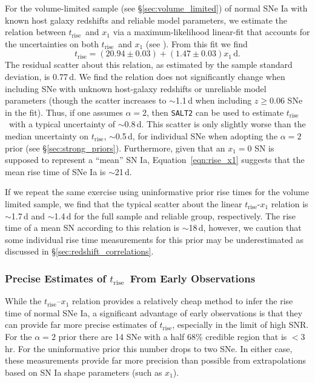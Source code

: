 \documentclass[twocolumn]{aastex63}
\newcommand{\trise}{$t_\mathrm{rise}$}
\begin{document}
For the volume-limited sample (see \S\ref{sec:volume_limited}) of normal SNe
Ia with known host galaxy redshifts and reliable model parameters, we estimate
the relation between \trise\ and $x_1$ via a maximum-likelihood linear-fit
that accounts for the uncertainties on both \trise\ and $x_1$ (see
\citealt{Hogg10}). From this fit we find
%
\begin{equation}
    t_\mathrm{rise} = (20.94 \pm 0.03) + (1.47 \pm 0.03)x_1\,\mathrm{d}.
    \label{eqn:rise_x1}
\end{equation} 
%
The residual scatter about this relation, as estimated by the sample standard
deviation, is 0.77\,d. We find the relation does not significantly change when
including SNe with unknown host-galaxy redshifts or unreliable model
parameters (though the scatter increases to $\sim$1.1\,d when including $z \ge
0.06$ SNe in the fit). Thus, if one assumes $\alpha = 2$, then \texttt{SALT2}
can be used to estimate \trise\ with a typical uncertainty of $\sim$0.8\,d.
This scatter is only slightly worse than the median uncertainty on \trise,
$\sim$0.5\,d, for individual SNe when adopting the $\alpha = 2$ prior (see
\S\ref{sec:strong_priors}). Furthermore, given that an $x_1 = 0$ SN is
supposed to represent a ``mean'' SN Ia, Equation~\ref{eqn:rise_x1} suggests
that the mean rise time of SNe Ia is $\sim$21\,d.

If we repeat the same exercise using uninformative prior rise times for the
volume limited sample, we find that the typical scatter about the linear
\trise-$x_1$ relation is $\sim$1.7\,d and $\sim$1.4\,d for the full sample and
reliable group, respectively. The rise time of a mean SN according to this
relation is $\sim$18\,d, however, we caution that some individual rise time
measurements for this prior may be underestimated as discussed in
\S\ref{sec:redshift_correlations}.

\subsubsection{Precise Estimates of \trise\ From Early Observations}

While the \trise--$x_1$ relation provides a relatively cheap method to infer
the rise time of normal SNe Ia, a significant advantage of early observations
is that they can provide far more precise estimates of \trise, especially in
the limit of high SNR. For the $\alpha = 2$ prior there are 14 SNe with a half
68\% credible region that is $< 3$\,hr. For the uninformative prior this
number drops to two SNe. In either case, these measurements provide far more
precision than possible from extrapolations based on SN Ia shape parameters
(such as $x_1$).
\end{document}
